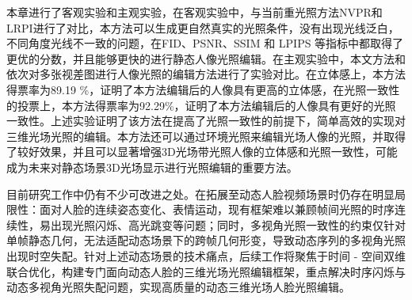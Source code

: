 本章进行了客观实验和主观实验，在客观实验中，与当前重光照方法NVPR和LRPI进行了对比，本方法可以生成更自然真实的光照条件，没有出现光线泛白，不同角度光线不一致的问题，在FID、PSNR、SSIM 和 LPIPS 等指标中都取得了更优的分数，并且能够更快的进行静态人像光照编辑。在主观实验中，本文方法和依次对多张视差图进行人像光照的编辑方法进行了实验对比。在立体感上，本方法得票率为89.19 \%，证明了本方法编辑后的人像具有更高的立体感，在光照一致性的投票上，本方法得票率为92.29\%，证明了本方法编辑后的人像具有更好的光照一致性。上述实验证明了该方法在提高了光照一致性的前提下，简单高效的实现对三维光场光照的编辑。本方法还可以通过环境光照来编辑光场人像的光照，并取得了较好效果，并且可以显著增强3D光场带光照人像的立体感和光照一致性，可能成为未来对静态场景3D光场显示进行光照编辑的重要方法。

目前研究工作中仍有不少可改进之处。在拓展至动态人脸视频场景时仍存在明显局限性：面对人脸的连续姿态变化、表情运动，现有框架难以兼顾帧间光照的时序连续性，易出现光照闪烁、高光跳变等问题；同时，多视角光照一致性的约束仅针对单帧静态几何，无法适配动态场景下的跨帧几何形变，导致动态序列的多视角光照出现时空失配。针对上述动态场景的技术痛点，后续工作将聚焦于时间 - 空间双维联合优化，构建专门面向动态人脸的三维光场光照编辑框架，重点解决时序闪烁与动态多视角光照失配问题，实现高质量的动态三维光场人脸光照编辑。


